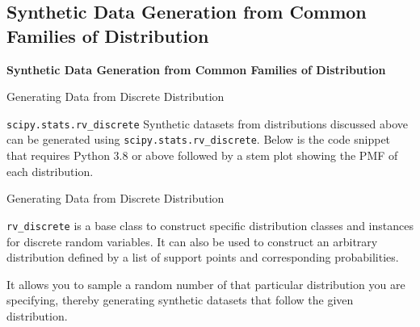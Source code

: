 \documentclass[aspectratio=169,xcolor=dvipsnames,svgnames,x11names,fleqn]{beamer}
\begin{document}
    \subsection{Synthetic Data Generation from Common Families of Distribution}
    
    \begin{frame}{}
    \begin{center}
        \Large \bf \color{DarkRed}
        Synthetic Data Generation from Common Families of Distribution
    \end{center}
    \end{frame}
    
    
    \begin{frame}[containsverbatim]{Generating Data from Discrete Distribution}
    
    \begin{gradblock}{\texttt{scipy.stats.rv\_discrete}}
        Synthetic datasets from distributions discussed above can be generated using \texttt{scipy.stats.rv\_discrete}. Below is the code snippet that requires Python 3.8 or above followed by a stem plot showing the PMF of each distribution.
    \end{gradblock}
\end{frame}
    

\begin{frame}[containsverbatim]{Generating Data from Discrete Distribution}

    \begin{facts}
        \texttt{rv\_discrete} is a base class to construct specific distribution classes and instances for discrete random variables. It can also be used to construct an arbitrary distribution defined by a list of support points and corresponding probabilities.
    
    It allows you to sample a random number of that particular distribution you are specifying, thereby generating synthetic datasets that follow the given distribution.
    \end{facts}
    
\end{frame}
    
\end{document}
